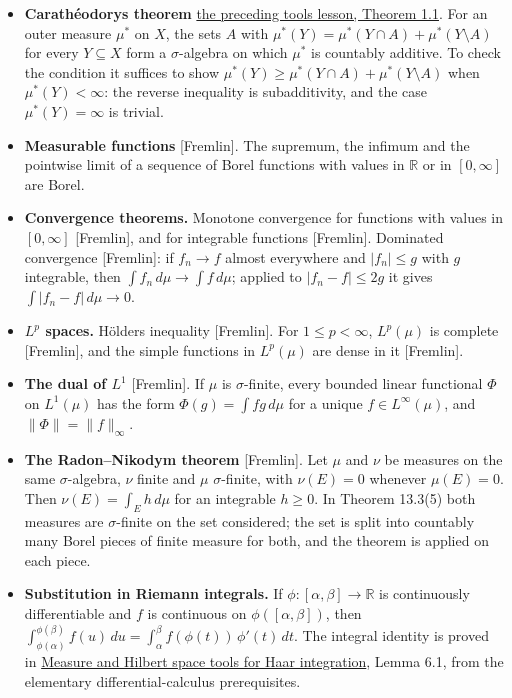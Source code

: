 \documentclass[
  english,
  11pt,
  a4paper,
]{article}
\providecommand{\tightlist}{%
  \setlength{\itemsep}{0pt}\setlength{\parskip}{0pt}}
\begin{document}
\begin{itemize}
\tightlist
\item
  \textbf{Carathéodory\textquotesingle s theorem}
  \hyperref[measure-and-hilbert-space-tools--1-from-an-outer-measure-to-a-measure]{the
  preceding tools lesson, Theorem 1.1}. For an outer measure \(\mu^*\)
  on \(X\), the sets \(A\) with
  \(\mu^*(Y)=\mu^*(Y\cap A)+\mu^*(Y\setminus A)\) for every
  \(Y\subseteq X\) form a \(\sigma\)-algebra on which \(\mu^*\) is
  countably additive. To check the condition it suffices to show
  \(\mu^*(Y)\geq\mu^*(Y\cap A)+\mu^*(Y\setminus A)\) when
  \(\mu^*(Y)<\infty\): the reverse inequality is subadditivity, and the
  case \(\mu^*(Y)=\infty\) is trivial.
\item
  \textbf{Measurable functions} {[}Fremlin{]}. The supremum, the infimum
  and the pointwise limit of a sequence of Borel functions with values
  in \(\mathbb R\) or in \([0,\infty]\) are Borel.
\item
  \textbf{Convergence theorems.} Monotone convergence for functions with
  values in \([0,\infty]\) {[}Fremlin{]}, and for integrable functions
  {[}Fremlin{]}. Dominated convergence {[}Fremlin{]}: if \(f_n\to f\)
  almost everywhere and \(|f_n|\leq g\) with \(g\) integrable, then
  \(\int f_n\,d\mu\to\int f\,d\mu\); applied to \(|f_n-f|\leq2g\) it
  gives \(\int|f_n-f|\,d\mu\to0\).
\item
  \textbf{\(L^p\) spaces.} Hölder\textquotesingle s inequality
  {[}Fremlin{]}. For \(1\leq p<\infty\), \(L^p(\mu)\) is complete
  {[}Fremlin{]}, and the simple functions in \(L^p(\mu)\) are dense in
  it {[}Fremlin{]}.
\item
  \textbf{The dual of \(L^1\)} {[}Fremlin{]}. If \(\mu\) is
  \(\sigma\)-finite, every bounded linear functional \(\Phi\) on
  \(L^1(\mu)\) has the form \(\Phi(g)=\int fg\,d\mu\) for a unique
  \(f\in L^\infty(\mu)\), and \(\|\Phi\|=\|f\|_\infty\).
\item
  \textbf{The Radon--Nikodym theorem} {[}Fremlin{]}. Let \(\mu\) and
  \(\nu\) be measures on the same \(\sigma\)-algebra, \(\nu\) finite and
  \(\mu\) \(\sigma\)-finite, with \(\nu(E)=0\) whenever \(\mu(E)=0\).
  Then \(\nu(E)=\int_Eh\,d\mu\) for an integrable \(h\geq0\). In Theorem
  13.3(5) both measures are \(\sigma\)-finite on the set considered; the
  set is split into countably many Borel pieces of finite measure for
  both, and the theorem is applied on each piece.
\item
  \textbf{Substitution in Riemann integrals.} If
  \(\phi\colon[\alpha,\beta]\to\mathbb R\) is continuously
  differentiable and \(f\) is continuous on \(\phi([\alpha,\beta])\),
  then
  \(\int_{\phi(\alpha)}^{\phi(\beta)}f(u)\,du=\int_\alpha^\beta f(\phi(t))\,\phi'(t)\,dt\).
  The integral identity is proved in
  \hyperref[measure-and-hilbert-space-tools]{Measure and Hilbert space
  tools for Haar integration}, Lemma 6.1, from the elementary
  differential-calculus prerequisites.
\end{itemize}
\end{document}
